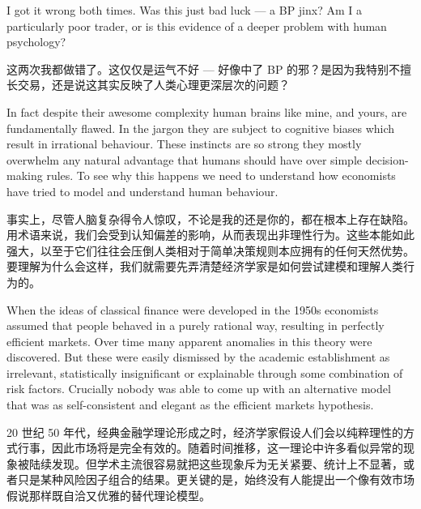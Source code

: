 \bipairgap

\begin{englishblock} I got it wrong both times. Was this just bad luck --- a BP jinx? Am I a particularly poor trader, or is this evidence of a deeper problem with human psychology? \end{englishblock}

\begin{chineseblock}这两次我都做错了。这仅仅是运气不好 --- 好像中了 BP 的邪？是因为我特别不擅长交易，还是说这其实反映了人类心理更深层次的问题？\end{chineseblock}

\bipairgap

\begin{englishblock} In fact despite their awesome complexity human brains like mine, and yours, are fundamentally flawed. In the jargon they are subject to cognitive biases which result in irrational behaviour. These instincts are so strong they mostly overwhelm any natural advantage that humans should have over simple decision-making rules. To see why this happens we need to understand how economists have tried to model and understand human behaviour. \end{englishblock}

\begin{chineseblock}事实上，尽管人脑复杂得令人惊叹，不论是我的还是你的，都在根本上存在缺陷。用术语来说，我们会受到认知偏差的影响，从而表现出非理性行为。这些本能如此强大，以至于它们往往会压倒人类相对于简单决策规则本应拥有的任何天然优势。要理解为什么会这样，我们就需要先弄清楚经济学家是如何尝试建模和理解人类行为的。\end{chineseblock}


\begin{englishblock} When the ideas of classical finance were developed in the 1950s economists assumed that people behaved in a purely rational way, resulting in perfectly efficient markets. Over time many apparent anomalies in this theory were discovered. But these were easily dismissed by the academic establishment as irrelevant, statistically insignificant or explainable through some combination of risk factors. Crucially nobody was able to come up with an alternative model that was as self-consistent and elegant as the efficient markets hypothesis. \end{englishblock}

\begin{chineseblock} 20 世纪 50 年代，经典金融学理论形成之时，经济学家假设人们会以纯粹理性的方式行事，因此市场将是完全有效的。随着时间推移，这一理论中许多看似异常的现象被陆续发现。但学术主流很容易就把这些现象斥为无关紧要、统计上不显著，或者只是某种风险因子组合的结果。更关键的是，始终没有人能提出一个像有效市场假说那样既自洽又优雅的替代理论模型。\end{chineseblock}

